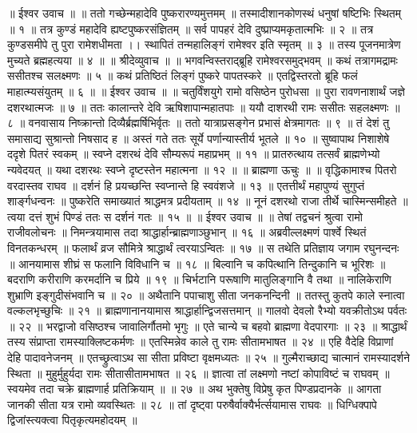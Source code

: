 ॥ ईश्वर उवाच ॥ ॥
ततो गच्छेन्महादेवि पुष्करारण्यमुत्तमम् ॥
तस्मादीशानकोणस्थं धनुषां षष्टिभिः स्थितम् ॥ १ ॥
तत्र कुण्डं महादेवि ह्यष्टपुष्करसंज्ञितम् ॥
सर्व पापहरं देवि दुष्प्राप्यमकृतात्मभिः ॥ २ ॥
तत्र कुण्डसमीपे तु पुरा रामेशधीमता ।।
स्थापितं तन्महालिङ्गं रामेश्वर इति स्मृतम् ॥ ३ ॥
तस्य पूजनमात्रेण मुच्यते ब्रह्महत्यया ॥ ४ ॥
॥ श्रीदेव्युवाच ॥ ॥
भगवन्विस्तराद्ब्रूहि रामेश्वरसमुद्भवम् ॥
कथं तत्रागमद्रामः ससीतश्च सलक्ष्मणः ॥ ५ ॥
कथं प्रतिष्ठितं लिङ्गं पुष्करे पापतस्करे ॥
एतद्विस्तरतो ब्रूहि फलं माहात्म्यसंयुतम् ॥ ६ ॥
॥ ईश्वर उवाच ॥ ॥
चतुर्विंशयुगे रामो वसिष्ठेन पुरोधसा ॥
पुरा रावणनाशार्थं जज्ञे दशरथात्मजः ॥ ७ ॥
ततः कालान्तरे देवि ऋषिशापान्महातपाः ॥
ययौ दाशरथी रामः ससीतः सहलक्ष्मणः ॥ ८ ॥
वनवासाय निष्क्रान्तो दिव्यैर्ब्रह्मर्षिभिर्वृतः ॥
ततो यात्राप्रसङ्गेन प्रभासं क्षेत्रमागतः ॥ ९ ॥
तं देशं तु समासाद्य सुश्रान्तो निषसाद ह ॥
अस्तं गते ततः सूर्ये पर्णान्यास्तीर्य भूतले ॥ १० ॥
सुष्वापाथ निशाशेषे ददृशे पितरं स्वकम् ॥
स्वप्ने दशरथं देवि सौम्यरूपं महाप्रभम् ॥ ११ ॥
प्रातरुत्थाय तत्सर्वं ब्राह्मणेभ्यो न्यवेदयत् ॥
यथा दशरथः स्वप्ने दृष्टस्तेन महात्मना ॥ १२ ॥
॥ ब्राह्मणा ऊचुः ॥ ॥
वृद्धिकामाश्च पितरो वरदास्तव राघव ॥
दर्शनं हि प्रयच्छन्ति स्वप्नान्ते हि स्ववंशजे ॥ १३ ॥
एतत्तीर्थं महापुण्यं सुगुप्तं शार्ङ्गधन्वनः ॥
पुष्करेति समाख्यातं श्राद्धमत्र प्रदीयताम् ॥ १४ ॥
नूनं दशरथो राजा तीर्थे चास्मिन्समीहते ॥
त्वया दत्तं शुभं पिण्डं ततः स दर्शनं गतः ॥ १५ ॥
॥ ईश्वर उवाच ॥ ॥
तेषां तद्वचनं श्रुत्वा रामो राजीवलोचनः ॥
निमन्त्रयामास तदा श्राद्धार्हान्ब्राह्मणाञ्छुभान् ॥ १६ ॥
अब्रवील्लक्ष्मणं पार्श्वे स्थितं विनतकन्धरम् ॥
फलार्थं व्रज सौमित्रे श्राद्धार्थं त्वरयाऽन्वितः ॥ १७ ॥
स तथेति प्रतिज्ञाय जगाम रघुनन्दनः ॥
आनयामास शीघ्रं स फलानि विविधानि च ॥ १८ ॥
बिल्वानि च कपित्थानि तिन्दुकानि च भूरिशः ॥
बदराणि करीराणि करमर्दानि च प्रिये ॥ १९ ॥
चिर्भटानि परूषाणि मातुलिङ्गानि वै तथा ॥
नालिकेराणि शुभ्राणि इङ्गुदीसंभवानि च ॥ २० ॥
अथैतानि पपाचाशु सीता जनकनन्दिनी ॥
ततस्तु कुतपे काले स्नात्वा वल्कलभृच्छुचिः ॥ २१ ॥
ब्राह्मणानानयामास श्राद्धार्हान्द्विजसत्तमान् ॥
गालवो देवलो रैभ्यो यवक्रीतोऽथ पर्वतः ॥ २२ ॥
भरद्वाजो वसिष्ठश्च जावालिर्गौतमो भृगुः ॥
एते चान्ये च बहवो ब्राह्मणा वेदपारगाः ॥ २३ ॥
श्राद्धार्थं तस्य संप्राप्ता रामस्याक्लिष्टकर्मणः ॥
एतस्मिन्नेव काले तु रामः सीतामभाषत ॥ २४ ॥
एहि वैदेहि विप्राणां देहि पादावनेजनम् ॥
एतच्छ्रुत्वाऽथ सा सीता प्रविष्टा वृक्षमध्यतः ॥ २५ ॥
गुल्मैराच्छाद्य चात्मानं रामस्यादर्शने स्थिता ॥
मुहुर्मुहुर्यदा रामः सीतासीतामभाषत ॥ २६ ॥
ज्ञात्वा तां लक्ष्मणो नष्टां कोपाविष्टं च राघवम् ॥
स्वयमेव तदा चक्रे ब्राह्मणार्ह प्रतिक्रियाम् ॥ ॥ २७ ॥
अथ भुक्तेषु विप्रेषु कृत पिण्डप्रदानके ॥
आगता जानकी सीता यत्र रामो व्यवस्थितः ॥ २८ ॥
तां दृष्ट्वा परुषैर्वाक्यैर्भर्त्सयामास राघवः ॥
धिग्धिक्पापे द्विजांस्त्यक्त्वा पितृकृत्यमहोदयम् ॥
